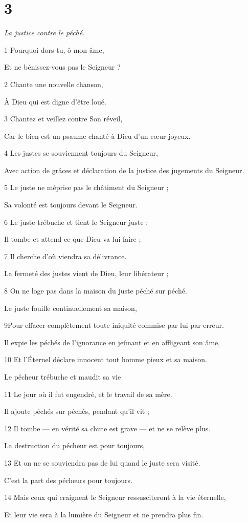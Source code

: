 \chapter{3}

\par \textit{La justice contre le péché.}

\par 1 Pourquoi dors-tu, ô mon âme,
\par     Et ne bénissez-vous pas le Seigneur ?
\par 2 Chante une nouvelle chanson,
\par     À Dieu qui est digne d'être loué.
\par 3 Chantez et veillez contre Son réveil,
\par     Car le bien est un psaume chanté à Dieu d’un cœur joyeux.
\par   
\par 4 Les justes se souviennent toujours du Seigneur,
\par     Avec action de grâces et déclaration de la justice des jugements du Seigneur.
\par 5 Le juste ne méprise pas le châtiment du Seigneur ;
\par     Sa volonté est toujours devant le Seigneur.
\par 6 Le juste trébuche et tient le Seigneur juste :
\par     Il tombe et attend ce que Dieu va lui faire ;
\par 7 Il cherche d'où viendra sa délivrance.
\par     La fermeté des justes vient de Dieu, leur libérateur ;
\par 8 On ne loge pas dans la maison du juste péché sur péché.
\par     Le juste fouille continuellement sa maison,
\par 9Pour effacer complètement toute iniquité commise par lui par erreur.
\par     Il expie les péchés de l'ignorance en jeûnant et en affligeant son âme,
\par 10 Et l'Éternel déclare innocent tout homme pieux et sa maison.
\par     Le pécheur trébuche et maudit sa vie
\par 11 Le jour où il fut engendré, et le travail de sa mère.
\par     Il ajoute péchés sur péchés, pendant qu'il vit ;
\par 12 Il tombe — en vérité sa chute est grave — et ne se relève plus.
\par     La destruction du pécheur est pour toujours,
\par 13 Et on ne se souviendra pas de lui quand le juste sera visité.
\par     C'est la part des pécheurs pour toujours.
\par   
\par 14 Mais ceux qui craignent le Seigneur ressusciteront à la vie éternelle,
\par     Et leur vie sera à la lumière du Seigneur et ne prendra plus fin.

